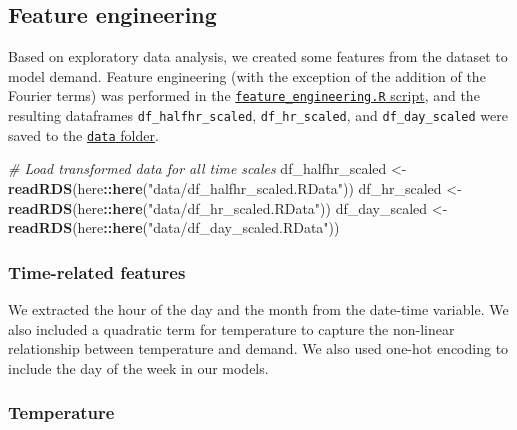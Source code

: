 \documentclass[
]{article}
\newenvironment{Shaded}{\begin{snugshade}}{\end{snugshade}}
\newcommand{\CommentTok}[1]{\textcolor[rgb]{0.56,0.35,0.01}{\textit{#1}}}
\newcommand{\FunctionTok}[1]{\textcolor[rgb]{0.13,0.29,0.53}{\textbf{#1}}}
\newcommand{\NormalTok}[1]{#1}
\newcommand{\OtherTok}[1]{\textcolor[rgb]{0.56,0.35,0.01}{#1}}
\newcommand{\SpecialCharTok}[1]{\textcolor[rgb]{0.81,0.36,0.00}{\textbf{#1}}}
\newcommand{\StringTok}[1]{\textcolor[rgb]{0.31,0.60,0.02}{#1}}
\begin{document}
\hypertarget{feature-engineering}{%
\subsection{Feature engineering}\label{feature-engineering}}

Based on exploratory data analysis, we created some features from the
dataset to model demand. Feature engineering (with the exception of the
addition of the Fourier terms) was performed in the
\href{https://github.com/Shermjj/SC-2-Electric-Boogalo/blob/main/feature_engineering.R}{\texttt{feature\_engineering.R}
script}, and the resulting dataframes \texttt{df\_halfhr\_scaled},
\texttt{df\_hr\_scaled}, and \texttt{df\_day\_scaled} were saved to the
\href{https://github.com/Shermjj/SC-2-Electric-Boogalo/tree/main/data}{\texttt{data}
folder}.

\begin{Shaded}
\begin{Highlighting}[]
\CommentTok{\# Load transformed data for all time scales}
\NormalTok{df\_halfhr\_scaled }\OtherTok{\textless{}{-}} \FunctionTok{readRDS}\NormalTok{(here}\SpecialCharTok{::}\FunctionTok{here}\NormalTok{(}\StringTok{"data/df\_halfhr\_scaled.RData"}\NormalTok{))}
\NormalTok{df\_hr\_scaled }\OtherTok{\textless{}{-}} \FunctionTok{readRDS}\NormalTok{(here}\SpecialCharTok{::}\FunctionTok{here}\NormalTok{(}\StringTok{"data/df\_hr\_scaled.RData"}\NormalTok{))}
\NormalTok{df\_day\_scaled }\OtherTok{\textless{}{-}} \FunctionTok{readRDS}\NormalTok{(here}\SpecialCharTok{::}\FunctionTok{here}\NormalTok{(}\StringTok{"data/df\_day\_scaled.RData"}\NormalTok{))}
\end{Highlighting}
\end{Shaded}

\hypertarget{time-related-features}{%
\subsubsection{Time-related features}\label{time-related-features}}

We extracted the hour of the day and the month from the date-time
variable. We also included a quadratic term for temperature to capture
the non-linear relationship between temperature and demand. We also used
one-hot encoding to include the day of the week in our models.

\hypertarget{temperature}{%
\subsubsection{Temperature}\label{temperature}}
\end{document}
